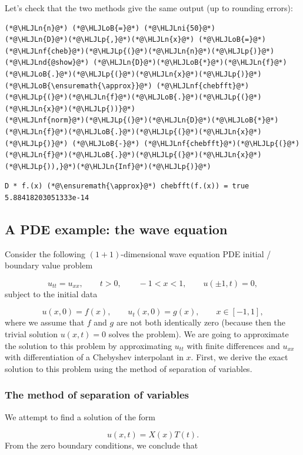 \documentclass[12pt,a4paper]{article}
\newcommand{\HLJLn}[1]{#1}
\newcommand{\HLJLnd}[1]{\textcolor[RGB]{214,102,97}{#1}}
\newcommand{\HLJLnf}[1]{\textcolor[RGB]{66,102,213}{#1}}
\newcommand{\HLJLni}[1]{\textcolor[RGB]{59,151,46}{#1}}
\newcommand{\HLJLoB}[1]{\textcolor[RGB]{102,102,102}{\textbf{#1}}}
\newcommand{\HLJLp}[1]{#1}
\begin{document}
Let's check that the two methods give the same output (up to rounding errors):


\begin{lstlisting}
(*@\HLJLn{n}@*) (*@\HLJLoB{=}@*) (*@\HLJLni{50}@*)
(*@\HLJLn{D}@*)(*@\HLJLp{,}@*)(*@\HLJLn{x}@*) (*@\HLJLoB{=}@*) (*@\HLJLnf{cheb}@*)(*@\HLJLp{(}@*)(*@\HLJLn{n}@*)(*@\HLJLp{)}@*)
(*@\HLJLnd{@show}@*) (*@\HLJLn{D}@*)(*@\HLJLoB{*}@*)(*@\HLJLn{f}@*)(*@\HLJLoB{.}@*)(*@\HLJLp{(}@*)(*@\HLJLn{x}@*)(*@\HLJLp{)}@*) (*@\HLJLoB{\ensuremath{\approx}}@*) (*@\HLJLnf{chebfft}@*)(*@\HLJLp{(}@*)(*@\HLJLn{f}@*)(*@\HLJLoB{.}@*)(*@\HLJLp{(}@*)(*@\HLJLn{x}@*)(*@\HLJLp{))}@*)
(*@\HLJLnf{norm}@*)(*@\HLJLp{(}@*)(*@\HLJLn{D}@*)(*@\HLJLoB{*}@*)(*@\HLJLn{f}@*)(*@\HLJLoB{.}@*)(*@\HLJLp{(}@*)(*@\HLJLn{x}@*)(*@\HLJLp{)}@*) (*@\HLJLoB{-}@*) (*@\HLJLnf{chebfft}@*)(*@\HLJLp{(}@*)(*@\HLJLn{f}@*)(*@\HLJLoB{.}@*)(*@\HLJLp{(}@*)(*@\HLJLn{x}@*)(*@\HLJLp{)),}@*)(*@\HLJLn{Inf}@*)(*@\HLJLp{)}@*)
\end{lstlisting}

\begin{lstlisting}
D * f.(x) (*@\ensuremath{\approx}@*) chebfft(f.(x)) = true
5.88418203051333e-14
\end{lstlisting}


\subsection{A PDE example: the wave equation}
Consider the following $(1+1)$-dimensional wave equation PDE initial / boundary value problem 

\[
u_{tt} = u_{xx}, \qquad t > 0, \qquad -1 < x < 1, \qquad u(\pm 1, t) = 0,
\]
subject to the initial data

\[
u(x,0) = f(x), \qquad u_t(x,0) = g(x), \qquad x \in [-1, 1],
\]
where we assume that $f$ and $g$ are not both identically zero (because then the trivial solution $u(x,t) = 0$ solves the problem).  We are going to approximate the solution to this problem by approximating $u_{tt}$ with finite differences and $u_{xx}$ with differentiation of a Chebyshev interpolant in $x$. First, we derive the exact solution to this problem using the method of separation of variables. 

\subsubsection{The method of separation of variables}
We attempt to find a solution of the form

\[
u(x,t) = X(x)T(t).
\]
From the zero boundary conditions, we conclude that
\end{document}
